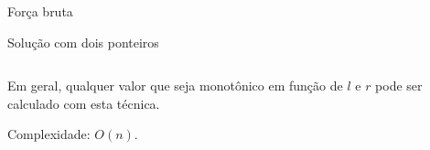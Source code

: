 \begin{frame}{Força bruta}
    
    \begin{block}{Solução com dois ponteiros}
        \footnotesize
        \inputminted{cpp}{codigos/twopointers.cpp}    
    \end{block} \pause

    Em geral, qualquer valor que seja monotônico em função de $l$ e $r$ pode ser calculado com esta técnica. \pause

    Complexidade: $O(n)$.
    
\end{frame}

